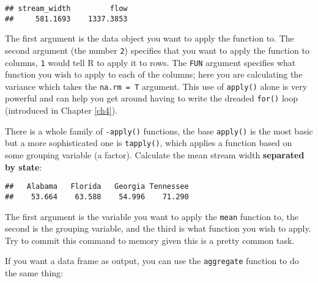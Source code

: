 \documentclass[]{book}
\newenvironment{Shaded}{\begin{snugshade}}{\end{snugshade}}
\newcommand{\KeywordTok}[1]{\textcolor[rgb]{0.13,0.29,0.53}{\textbf{#1}}}
\newcommand{\DataTypeTok}[1]{\textcolor[rgb]{0.13,0.29,0.53}{#1}}
\newcommand{\OperatorTok}[1]{\textcolor[rgb]{0.81,0.36,0.00}{\textbf{#1}}}
\newcommand{\NormalTok}[1]{#1}
\theoremstyle{definition}
\theoremstyle{definition}
\theoremstyle{definition}
\theoremstyle{remark}
\begin{document}
\begin{verbatim}
## stream_width         flow 
##     581.1693    1337.3853
\end{verbatim}

The first argument is the data object you want to apply the function to.
The second argument (the number \texttt{2}) specifies that you want to
apply the function to columns, \texttt{1} would tell R to apply it to
rows. The \texttt{FUN} argument specifies what function you wish to
apply to each of the columns; here you are calculating the variance
which takes the \texttt{na.rm\ =\ T} argument. This use of
\texttt{apply()} alone is very powerful and can help you get around
having to write the dreaded \texttt{for()} loop (introduced in Chapter
\ref{ch4}).

There is a whole family of \texttt{-apply()} functions, the base
\texttt{apply()} is the most basic but a more sophisticated one is
\texttt{tapply()}, which applies a function based on some grouping
variable (a factor). Calculate the mean stream width \textbf{separated
by state}:

\begin{Shaded}
\end{Shaded}

\begin{verbatim}
##   Alabama   Florida   Georgia Tennessee 
##    53.664    63.588    54.996    71.290
\end{verbatim}

The first argument is the variable you want to apply the \texttt{mean}
function to, the second is the grouping variable, and the third is what
function you wish to apply. Try to commit this command to memory given
this is a pretty common task.

If you want a data frame as output, you can use the \texttt{aggregate}
function to do the same thing:

\begin{Shaded}
\end{Shaded}
\end{document}
